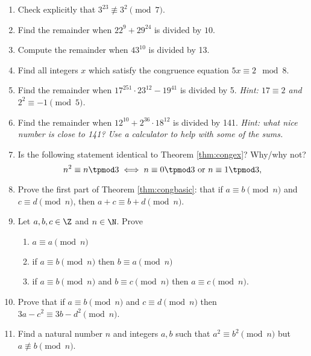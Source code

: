 \begin{enumerate}\renewcommand{\labelenumi}{\thesubsection.\theenumi}
  \item Check explicitly that $3^{23}\not\equiv 3^2\pmod 7$.
  
  \item Find the remainder when $22^9+29^{24}$ is divided by $10$.
  
  \item Compute the remainder when $43^{10}$ is divided by 13.
  
  \item Find all integers $x$ which satisfy the congruence equation $5x\equiv 2\mod 8$.
  
  \item Find the remainder when $17^{251}\cdot 23^{12}-19^{41}$ is divided by 5. \emph{Hint: $17\equiv 2$ and $2^2\equiv -1\pmod 5$.}
  
  \item Find the remainder when $12^{10}+2^{36}\cdot 18^{12}$ is divided by 141. \emph{Hint: what nice number is close to 141? Use a calculator to help with some of the sums.}
  
  \item Is the following statement identical to Theorem \ref{thm:congex}? Why/why not?
  \[n^2\equiv n\tpmod 3\iff n\equiv 0\tpmod 3\text{ or }n\equiv 1\tpmod 3,\]
  
  \item Prove the first part of Theorem \ref{thm:congbasic}: that if $a \equiv b \pmod n$ and $c \equiv d \pmod n$, then $a + c \equiv b + d \pmod n$.
  
    \item Let $a,b,c \in \Z$ and $n \in \N$. Prove
    \begin{enumerate}
        \item $a \equiv a \pmod n$
        \item if $a \equiv b \pmod n$ then $b \equiv a \pmod n$
        \item if $a \equiv b \pmod n$ and $b \equiv c \pmod n$ then $a \equiv c \pmod n$.
    \end{enumerate}
    
  
  \item Prove that if $a\equiv b\pmod n$ and $c\equiv d\pmod n$ then $3a-c^2\equiv 3b-d^2\pmod n$.
  

  \item Find a natural number $n$ and integers $a,b$ such that $a^2\equiv b^2\pmod n$ but $a\not\equiv b\pmod n$.
  

\end{enumerate}
